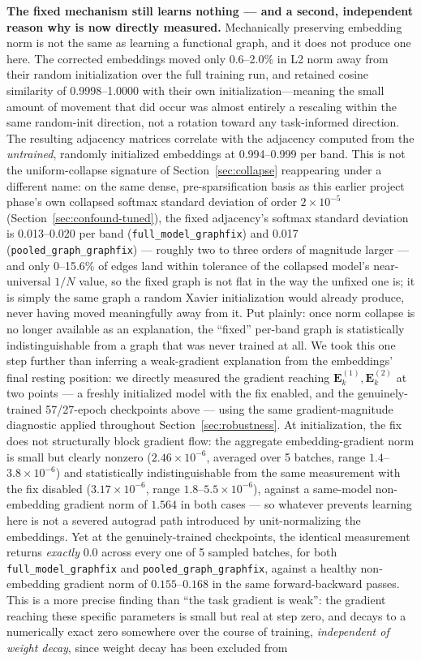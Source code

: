 \documentclass[journal]{IEEEtran}
\begin{document}
\textbf{The fixed mechanism still learns nothing --- and a second, independent reason why is now directly measured.} Mechanically preserving embedding norm is not the same as learning a functional graph, and it does not produce one here. The corrected embeddings moved only 0.6--2.0\% in L2 norm away from their random initialization over the full training run, and retained cosine similarity of 0.9998--1.0000 with their own initialization---meaning the small amount of movement that did occur was almost entirely a rescaling within the same random-init direction, not a rotation toward any task-informed direction. The resulting adjacency matrices correlate with the adjacency computed from the \emph{untrained}, randomly initialized embeddings at 0.994--0.999 per band. This is not the uniform-collapse signature of Section~\ref{sec:collapse} reappearing under a different name: on the same dense, pre-sparsification basis as this earlier project phase's own collapsed softmax standard deviation of order $2\times10^{-5}$ (Section~\ref{sec:confound-tuned}), the fixed adjacency's softmax standard deviation is 0.013--0.020 per band (\texttt{full\_model\_graphfix}) and 0.017 (\texttt{pooled\_graph\_graphfix}) --- roughly two to three orders of magnitude larger --- and only 0--15.6\% of edges land within tolerance of the collapsed model's near-universal $1/N$ value, so the fixed graph is not flat in the way the unfixed one is; it is simply the same graph a random Xavier initialization would already produce, never having moved meaningfully away from it. Put plainly: once norm collapse is no longer available as an explanation, the ``fixed'' per-band graph is statistically indistinguishable from a graph that was never trained at all. We took this one step further than inferring a weak-gradient explanation from the embeddings' final resting position: we directly measured the gradient reaching $\mathbf{E}^{(1)}_k,\mathbf{E}^{(2)}_k$ at two points --- a freshly initialized model with the fix enabled, and the genuinely-trained 57/27-epoch checkpoints above --- using the same gradient-magnitude diagnostic applied throughout Section~\ref{sec:robustness}. At initialization, the fix does not structurally block gradient flow: the aggregate embedding-gradient norm is small but clearly nonzero ($2.46\times10^{-6}$, averaged over 5 batches, range $1.4$--$3.8\times10^{-6}$) and statistically indistinguishable from the same measurement with the fix disabled ($3.17\times10^{-6}$, range $1.8$--$5.5\times10^{-6}$), against a same-model non-embedding gradient norm of $1.564$ in both cases --- so whatever prevents learning here is not a severed autograd path introduced by unit-normalizing the embeddings. Yet at the genuinely-trained checkpoints, the identical measurement returns \emph{exactly} $0.0$ across every one of 5 sampled batches, for both \texttt{full\_model\_graphfix} and \texttt{pooled\_graph\_graphfix}, against a healthy non-embedding gradient norm of $0.155$--$0.168$ in the same forward-backward passes. This is a more precise finding than ``the task gradient is weak'': the gradient reaching these specific parameters is small but real at step zero, and decays to a numerically exact zero somewhere over the course of training, \emph{independent of weight decay}, since weight decay has been excluded from 
\end{document}
